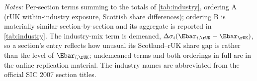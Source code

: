 %
 
\begin{table}[h]
\centering
\caption{Industry-mix and within-industry contributions by SIC section}
\label{tab:industrysections}
\small

\begin{minipage}{0.92\textwidth}
\vspace{0.4em}\footnotesize
\textit{Notes:} Per-section terms summing to the totals of \cref{tab:industry}, ordering A (rUK within-industry exposure, Scottish share differences); ordering B is materially similar section-by-section and its aggregate is reported in \cref{tab:industry}. The industry-mix term is demeaned, $\Delta\sigma_i (\Ebar_{i,\rUK} - \Ebar_{\rUK})$, so a section's entry reflects how unusual its Scotland--rUK share gap is rather than the level of $\Ebar_{i,\rUK}$; undemeaned terms and both orderings in full are in the online replication material. The industry names are abbreviated from the official SIC 2007 section titles.
\end{minipage}
\end{table}